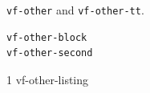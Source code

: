 \documentclass{article}
\begin{document}
\verb|vf-other| and \texttt{vf-other-tt}.
\begin{verbatim}
vf-other-block
vf-other-second
\end{verbatim}
\begin{listing}{1}
vf-other-listing
\end{listing}
\end{document}
